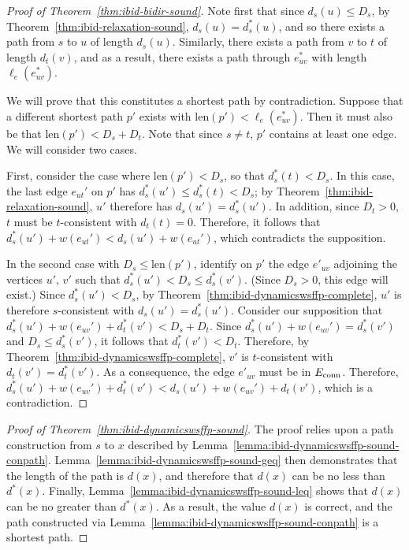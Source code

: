 \begin{proof}[Proof of Theorem~\ref{thm:ibid-bidir-sound}]
Note first that since $d_s(u) \leq D_s$,
by Theorem~\ref{thm:ibid-relaxation-sound},
$d_s(u) = d^*_s(u)$,
and so there exists a path from $s$ to $u$ of length $d_s(u)$.
Similarly, there exists a path from $v$ to $t$ of length $d_t(v)$,
and as a result,
there exists a path through $e^*_{uv}$ with length $\ell_e(e^*_{uv})$.

We will prove that this constitutes a shortest path by contradiction.
Suppose that a different shortest path $p'$ exists with
$\mbox{len}(p') < \ell_e(e^*_{uv})$.
Then it must also be that
$\mbox{len}(p') < D_s + D_t$.
Note that since $s \neq t$, $p'$ contains at least one edge.
We will consider two cases.

First, consider the case where $\mbox{len}(p') < D_s$,
so that $d_s^*(t) < D_s$.
In this case,
the last edge $e_{ut}'$ on $p'$
has $d_s^*(u') \leq d_s^*(t) < D_s$;
by Theorem~\ref{thm:ibid-relaxation-sound},
$u'$ therefore has $d_s(u') = d_s^*(u')$.
In addition,
since $D_t > 0$,
$t$ must be $t$-consistent with $d_t(t) = 0$.
Therefore,
it follows that $d_s^*(u') + w(e_{ut}') < d_s(u') + w(e_{ut}')$,
which contradicts the supposition.

In the second case with $D_s \leq \mbox{len}(p')$,
identify on $p'$ the edge $e'_{uv}$ adjoining the vertices $u'$, $v'$
such that $d_s^*(u') < D_s \leq d_s^*(v')$.
(Since $D_s > 0$, this edge will exist.)
Since $d_s^*(u') < D_s$,
by Theorem~\ref{thm:ibid-dynamicswsffp-complete},
$u'$ is therefore $s$-consistent with $d_s(u') = d_s^*(u')$.
Consider our supposition that
$d_s^*(u') + w(e_{uv}') + d_t^*(v') < D_s + D_t$.
Since $d_s^*(u') + w(e_{uv}') = d_s^*(v')$
and $D_s \leq d_s^*(v')$,
it follows that
$d_t^*(v') < D_t$.
Therefore,
by Theorem~\ref{thm:ibid-dynamicswsffp-complete},
$v'$ is $t$-consistent with $d_t(v') = d_t^*(v')$.
As a consequence,
the edge $e'_{uv}$ must be in $E_{\mbox{\scriptsize conn}}$.
Therefore,
$d_s^*(u') + w(e_{uv}') + d_t^*(v')
   < d_s(u') + w(e_{uv}') + d_t(v')$,
which is a contradiction.
\end{proof}


\begin{proof}[Proof of Theorem~\ref{thm:ibid-dynamicswsffp-sound}]
The proof relies upon a path construction from $s$ to $x$
described by Lemma~\ref{lemma:ibid-dynamicswsffp-sound-conpath}.
Lemma~\ref{lemma:ibid-dynamicswsffp-sound-geq} then demonstrates
that the length of the path is $d(x)$,
and therefore that $d(x)$ can be no less than $d^*(x)$.
Finally,
Lemma~\ref{lemma:ibid-dynamicswsffp-sound-leq}
shows that $d(x)$ can be no greater than $d^*(x)$.
As a result,
the value $d(x)$ is correct,
and the path constructed
via Lemma~\ref{lemma:ibid-dynamicswsffp-sound-conpath}
is a shortest path.
\end{proof}

